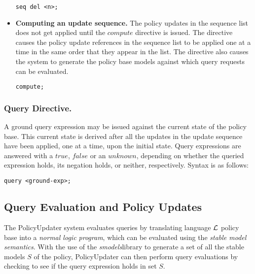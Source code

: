 \documentclass[11pt]{llncs}
\begin{document}
\begin{itemize}
            \begin{verbatim}seq del <n>;\end{verbatim}

          \vspace{1mm}
          \item
            {\bf Computing an update sequence.} The policy updates in the
            sequence list does not get applied until the $compute$ directive
            is issued. The directive causes the policy update references in
            the sequence list to be applied one at a time in the same order
            that they appear in the list. The directive also causes the
            system to generate the policy base models against which query
            requests can be evaluated.

           \begin{verbatim}compute;\end{verbatim}
        \end{itemize}

      \subsubsection{Query Directive.}

        A ground query expression may be issued against the current state of
        the policy base. This current state is derived after all the updates
        in the update sequence have been applied, one at a time, upon the
        initial state. Query expressions are answered with a $true$, $false$
        or an $unknown$, depending on whether the queried expression holds,
        its negation holds, or neither, respectively. Syntax is as follows:

        \begin{verbatim}query <ground-exp>;\end{verbatim}

    \subsection{Query Evaluation and Policy Updates}

      The PolicyUpdater system evaluates queries by translating language
      ${\cal L}$ policy base into a {\em normal logic program}, which can be
      evaluated using the {\em stable model semantics}. With the use of the
      {\em smodels}\footnotemark library to generate a set of all the stable
      models $S$ of the policy, PolicyUpdater can then perform query
      evaluations by checking to see if the query expression holds in set $S$.
\end{document}
